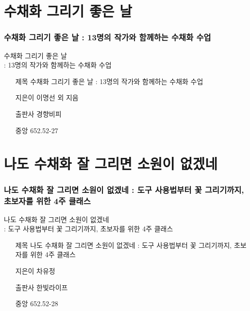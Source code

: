 \documentclass[aspectratio=1610,17pt,xcolor=pdftex,dvipsnames,table,handout]{beamer}
\begin{document}

		\section{수채화 그리기 좋은 날 }	
		\begin{frame} [t,plain]
		\frametitle{수채화 그리기 좋은 날 : 13명의 작가와 함께하는 수채화 수업}	
			\begin{block} {수채화 그리기 좋은 날 \\: 13명의 작가와 함께하는 수채화 수업}	
			\setlength{\leftmargini}{4em}			
			\begin{itemize}
				\item [제목] 수채화 그리기 좋은 날 : 13명의 작가와 함께하는 수채화 수업
				\item [지은이] 이명선 외 지음	
				\item [출판사] 경향비피	
				\item [중앙] 652.52-27 		
			\end{itemize}
			\end{block}						
								
		\end{frame}						


 	
		\section{나도 수채화 잘 그리면 소원이 없겠네 }
		\begin{frame} [t,plain]
		\frametitle{나도 수채화 잘 그리면 소원이 없겠네 : 도구 사용법부터 꽃 그리기까지, 초보자를 위한 4주 클래스}
			\begin{block} {나도 수채화 잘 그리면 소원이 없겠네 \\: 도구 사용법부터 꽃 그리기까지, 초보자를 위한 4주 클래스}
			\setlength{\leftmargini}{4em}			
			\begin{itemize}
				\item [제목] 나도 수채화 잘 그리면 소원이 없겠네 : 도구 사용법부터 꽃 그리기까지, 초보자를 위한 4주 클래스
				\item [지은이] 차유정	
				\item [출판사] 한빛라이프	
				\item [중앙] 652.52-28		
			\end{itemize}
			\end{block}						
								
		\end{frame}						
\end{document}
